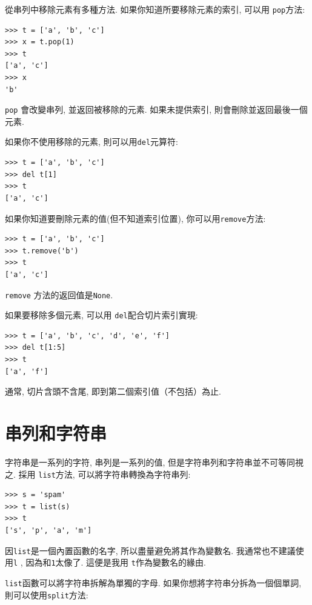 \documentclass[10pt]{book}
\begin{document}
從串列中移除元素有多種方法. 
如果你知道所要移除元素的索引, 可以用
{\tt pop}方法:

\begin{verbatim}
>>> t = ['a', 'b', 'c']
>>> x = t.pop(1)
>>> t
['a', 'c']
>>> x
'b'
\end{verbatim}
%
{\tt pop} 會改變串列, 並返回被移除的元素. 
如果未提供索引, 則會刪除並返回最後一個元素. 

如果你不使用移除的元素, 則可以用{\tt del}元算符:

\begin{verbatim}
>>> t = ['a', 'b', 'c']
>>> del t[1]
>>> t
['a', 'c']
\end{verbatim}
%
如果你知道要刪除元素的值(但不知道索引位置), 你可以用{\tt remove}方法:

\begin{verbatim}
>>> t = ['a', 'b', 'c']
>>> t.remove('b')
>>> t
['a', 'c']
\end{verbatim}
%
{\tt remove} 方法的返回值是{\tt None}.

如果要移除多個元素, 可以用 {\tt del}配合切片索引實現:

\begin{verbatim}
>>> t = ['a', 'b', 'c', 'd', 'e', 'f']
>>> del t[1:5]
>>> t
['a', 'f']
\end{verbatim}
%
通常, 切片含頭不含尾, 即到第二個索引值（不包括）為止. 



\section{串列和字符串}

字符串是一系列的字符, 串列是一系列的值, 但是字符串列和字符串並不可等同視之. 
採用 {\tt list}方法, 可以將字符串轉換為字符串列:

\begin{verbatim}
>>> s = 'spam'
>>> t = list(s)
>>> t
['s', 'p', 'a', 'm']
\end{verbatim}
%
因{\tt list}是一個內置函數的名字, 所以盡量避免將其作為變數名. 
我通常也不建議使用{\tt l} , 因為和{\tt 1}太像了. 這便是我用
{\tt t}作為變數名的緣由. 

{\tt list}函數可以將字符串拆解為單獨的字母. 
如果你想將字符串分拆為一個個單詞, 則可以使用{\tt split}方法:
\end{document}
